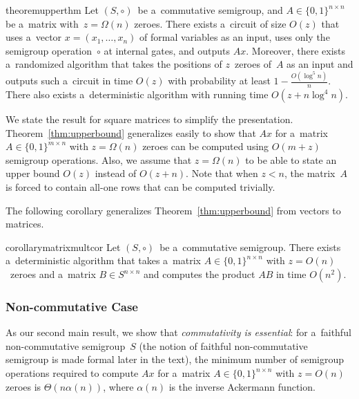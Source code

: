 \documentclass[review,onefignum,onetabnum]{siamart190516}
\begin{document}
\begin{restatable}{theorem}{upperthm}
\label{thm:upperbound}
Let $(S, \circ)$~be a~commutative semigroup,
and $A \in \{0,1\}^{n \times n}$ be a~matrix
with~$z=\Omega(n)$ zeroes.
There exists a~circuit of size $O(z)$ that uses
a~vector $x = (x_1,\ldots, x_n)$ of formal variables as an input,
uses only the semigroup operation~$\circ$ at internal gates,
and outputs $Ax$. Moreover, there exists a~randomized
algorithm that takes the positions of $z$~zeroes of~$A$
as an input and outputs such a~circuit in time $O(z)$
with probability at least $1-\frac{O(\log^5n)}{n}$. There also
exists a~deterministic algorithm with running time $O(z+n\log^4n)$.
\end{restatable}

We state the result for square matrices to simplify the presentation. Theorem~\ref{thm:upperbound} generalizes easily
to show that $Ax$ for a~matrix $A \in \{0,1\}^{m \times n}$ with $z=\Omega(n)$ zeroes can be computed using $O(m+z)$ semigroup operations. Also,
we assume that $z=\Omega(n)$ to be able to state an upper bound $O(z)$ instead of $O(z+n)$. Note that when
$z<n$, the matrix~$A$ is forced to contain all-one rows
that can be computed trivially.

The following corollary generalizes Theorem~\ref{thm:upperbound}
from vectors to matrices.

\begin{restatable}{corollary}{matrixmultcor}
\label{cor:matrixmultiplication}
Let $(S, \circ)$~be a~commutative semigroup.
There exists a~deterministic algorithm that takes
a~matrix $A \in \{0,1\}^{n \times n}$ with
$z=O(n)$~zeroes
and a~matrix $B \in S^{n \times n}$ and computes
the product $AB$ in time $O(n^2)$.
\end{restatable}

\subsubsection{Non-commutative Case}
As our second main result, we show that \emph{commutativity is essential}: for
a~faithful non-commutative semigroup~$S$
(the notion of faithful non-commutative semigroup  is made formal
later in the text), the minimum number of semigroup operations
required to compute $Ax$ for a~matrix
$A \in \{0,1\}^{n \times n}$ with $z=O(n)$ zeroes is
$\Theta(n\alpha(n))$, where $\alpha(n)$ is the inverse Ackermann function.
\end{document}
